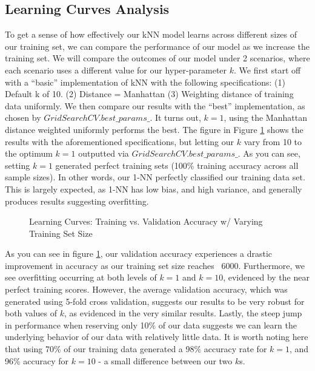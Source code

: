 \documentclass[letterpaper,12pt]{article}
\begin{document}
\subsection{Learning Curves Analysis}
To get a sense of how effectively our kNN model learns across different sizes of our training set, we can compare the performance of our model as we increase the training set.  We will compare the outcomes of our model under 2 scenarios, where each scenario uses a different value for our hyper-parameter $k$.  We first start off with a ``basic'' implementation of kNN with the following specifications:  (1) Default k of 10.  (2) Distance = Manhattan (3) Weighting distance of training data uniformly. We then compare our results with the ``best'' implementation, as chosen by $GridSearchCV.best\_params\_$.  It turns out, $ k=1$, using the Manhattan distance weighted uniformly performs the best.  The figure in Figure \ref{fig:kNN Learning Curves} shows the results with the aforementioned specifications, but letting our $k$ vary from 10 to the optimum $k=1$ outputted via $GridSearchCV.best\_params\_$.  As you can see, setting $k=1$ generated perfect training sets (100\% training accuracy across all sample sizes).  In other words, our 1-NN perfectly classified our training data set.  This is largely expected, as 1-NN has low bias, and high variance, and generally produces results suggesting overfitting.  


\begin{figure} %
  \centering
  \hspace{8pt}%
  \caption{Learning Curves:  Training vs. Validation Accuracy w/ Varying Training Set Size}\label{fig:kNN Learning Curves}
\end{figure}

As you can see in figure \ref{fig:kNN Learning Curves}, our validation accuracy experiences a drastic improvement in accuracy as our training set size reaches ~6000.  Furthermore, we see overfitting occurring at both levels of $k=1$ and $k=10$, evidenced by the near perfect training scores.  However, the average validation accuracy, which was generated using 5-fold cross validation, suggests our results to be very robust for both values of $k$, as evidenced in the very similar results.  Lastly, the steep jump in performance when reserving only 10\% of our data suggests we can learn the underlying behavior of our data with relatively little data.  It is worth noting here that using 70\% of our training data generated a 98\% accuracy rate for $k=1$, and 96\% accuracy for $k=10$ - a small difference between our two $k$s.
\end{document}
